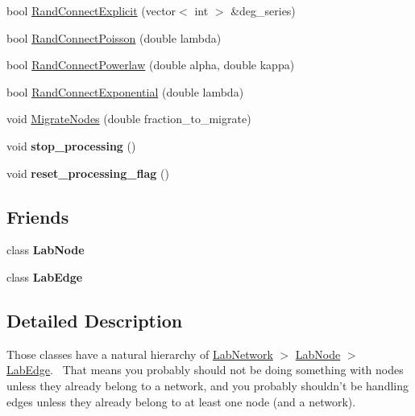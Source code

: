 \begin{DoxyCompactItemize}
bool \hyperlink{classelps_1_1_lab_network_aec222034cb40e92ca38dfa4061dc3329}{Rand\+Connect\+Explicit} (vector$<$ int $>$ \&deg\+\_\+series)
\item 
bool \hyperlink{classelps_1_1_lab_network_a960fab47aa54eafa962e73a29ac15d46}{Rand\+Connect\+Poisson} (double lambda)
\item 
bool \hyperlink{classelps_1_1_lab_network_a5107e01fd7f70e9d8ac3e54abd7003e4}{Rand\+Connect\+Powerlaw} (double alpha, double kappa)
\item 
bool \hyperlink{classelps_1_1_lab_network_aaa119c9d408ba708a5e3d39ac8ef3b9b}{Rand\+Connect\+Exponential} (double lambda)
\item 
void \hyperlink{classelps_1_1_lab_network_afc4aaf1abf21171bc2879c81da7e8b85}{Migrate\+Nodes} (double fraction\+\_\+to\+\_\+migrate)
\item 
\hypertarget{classelps_1_1_lab_network_a0d89975b3151890de887c864642f3f84}{void {\bfseries stop\+\_\+processing} ()}\label{classelps_1_1_lab_network_a0d89975b3151890de887c864642f3f84}

\item 
\hypertarget{classelps_1_1_lab_network_aaa6dd02033b0838fea245852a7b2b5ae}{void {\bfseries reset\+\_\+processing\+\_\+flag} ()}\label{classelps_1_1_lab_network_aaa6dd02033b0838fea245852a7b2b5ae}

\end{DoxyCompactItemize}
\subsection*{Friends}
\begin{DoxyCompactItemize}
\item 
\hypertarget{classelps_1_1_lab_network_ac56a76b904b641106cb3d628fdfe41ea}{class {\bfseries Lab\+Node}}\label{classelps_1_1_lab_network_ac56a76b904b641106cb3d628fdfe41ea}

\item 
\hypertarget{classelps_1_1_lab_network_a046f6907a306a9e8f90bc4e7bb2a9a4b}{class {\bfseries Lab\+Edge}}\label{classelps_1_1_lab_network_a046f6907a306a9e8f90bc4e7bb2a9a4b}

\end{DoxyCompactItemize}


\subsection{Detailed Description}
Those classes have a natural hierarchy of \hyperlink{classelps_1_1_lab_network}{Lab\+Network} $>$ \hyperlink{classelps_1_1_lab_node}{Lab\+Node} $>$ \hyperlink{classelps_1_1_lab_edge}{Lab\+Edge}.~\newline
 That means you probably should not be doing something with nodes unless they already belong to a network, and you probably shouldn't be handling edges unless they already belong to at least one node (and a network).

